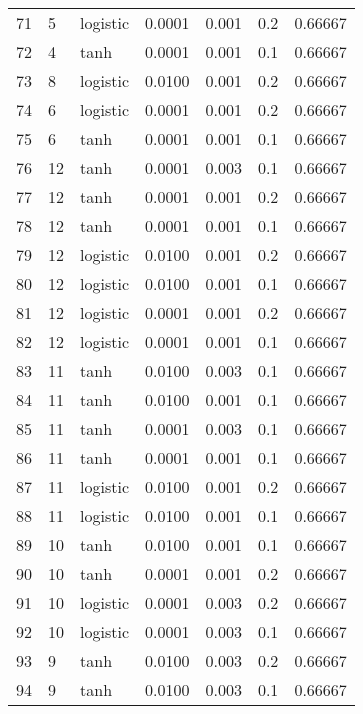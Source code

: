 \begin{tabular}{lllrrrr}
71  &           5 &  logistic &  0.0001 &  0.001 &  0.2 &   0.66667 \\
72  &           4 &      tanh &  0.0001 &  0.001 &  0.1 &   0.66667 \\
73  &           8 &  logistic &  0.0100 &  0.001 &  0.2 &   0.66667 \\
74  &           6 &  logistic &  0.0001 &  0.001 &  0.2 &   0.66667 \\
75  &           6 &      tanh &  0.0001 &  0.001 &  0.1 &   0.66667 \\
76  &          12 &      tanh &  0.0001 &  0.003 &  0.1 &   0.66667 \\
77  &          12 &      tanh &  0.0001 &  0.001 &  0.2 &   0.66667 \\
78  &          12 &      tanh &  0.0001 &  0.001 &  0.1 &   0.66667 \\
79  &          12 &  logistic &  0.0100 &  0.001 &  0.2 &   0.66667 \\
80  &          12 &  logistic &  0.0100 &  0.001 &  0.1 &   0.66667 \\
81  &          12 &  logistic &  0.0001 &  0.001 &  0.2 &   0.66667 \\
82  &          12 &  logistic &  0.0001 &  0.001 &  0.1 &   0.66667 \\
83  &          11 &      tanh &  0.0100 &  0.003 &  0.1 &   0.66667 \\
84  &          11 &      tanh &  0.0100 &  0.001 &  0.1 &   0.66667 \\
85  &          11 &      tanh &  0.0001 &  0.003 &  0.1 &   0.66667 \\
86  &          11 &      tanh &  0.0001 &  0.001 &  0.1 &   0.66667 \\
87  &          11 &  logistic &  0.0100 &  0.001 &  0.2 &   0.66667 \\
88  &          11 &  logistic &  0.0100 &  0.001 &  0.1 &   0.66667 \\
89  &          10 &      tanh &  0.0100 &  0.001 &  0.1 &   0.66667 \\
90  &          10 &      tanh &  0.0001 &  0.001 &  0.2 &   0.66667 \\
91  &          10 &  logistic &  0.0001 &  0.003 &  0.2 &   0.66667 \\
92  &          10 &  logistic &  0.0001 &  0.003 &  0.1 &   0.66667 \\
93  &           9 &      tanh &  0.0100 &  0.003 &  0.2 &   0.66667 \\
94  &           9 &      tanh &  0.0100 &  0.003 &  0.1 &   0.66667 \\

\end{tabular}
